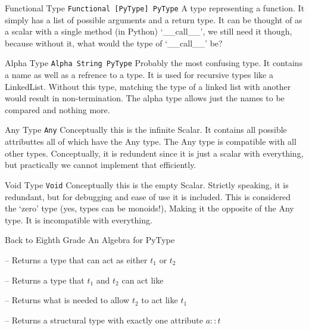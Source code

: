\documentclass[12pt,t]{beamer}
\newcommand{\subt}[1]{{\footnotesize \color{subtitle} {#1}}}
\newcommand{\codehs}{\texttt}
\newcommand{\vitem}{\vfill\item}
\begin{document}
\begin{frame}{Functional Type}
    \vfill
    \codehs{Functional [PyType] PyType}
    \vfill
    A type representing a function. It simply has a list
    of possible arguments and a return type. It can be thought
    of as a scalar with a single method (in Python) `\_\_call\_\_',
    we still need it though, because without it, what would the type
    of `\_\_call\_\_' be?
    \vfill
\end{frame}

\begin{frame}{Alpha Type}
    \vfill
    \codehs{Alpha String PyType}
    \vfill
    Probably the most confusing type. It contains a name as well
    as a refrence to a type. It is used for recursive types like
    a LinkedList. Without this type, matching the type of a linked
    list with another would result in non-termination. The alpha
    type allows just the names to be compared and nothing more.
    \vfill
\end{frame}

\begin{frame}{Any Type}
    \vfill
    \codehs{Any}
    \vfill
    Conceptually this is the infinite Scalar. It contains all
    possible attributtes all of which have the Any type. The
    Any type is compatible with all other types. Conceptually,
    it is redundent since it is just a scalar with everything,
    but practically we cannot implement that efficiently.
    \vfill
\end{frame}

\begin{frame}{Void Type}
    \vfill
    \codehs{Void}
    \vfill
    Conceptually this is the empty Scalar. Strictly speaking, it
    is redundant, but for debugging and ease of use it is included. This
    is considered the `zero' type (yes, types can be monoids!),
    Making it the opposite of the Any type. It is incompatible with everything.
    \vfill
\end{frame}

\begin{frame}{Back to Eighth Grade}
    \subt{An Algebra for PyType}

    \begin{description}
        \vitem[Union $t_1$ $t_2$] -- Returns a type that can act as either $t_1$ or $t_2$
        \vitem[Intersection $t_1$ $t_2$] -- Returns a type that $t_1$ and $t_2$ can act like
        \vitem[Difference $t_1$ $t_2$] -- Returns what is needed to allow $t_2$ to act like $t_1$
        \vitem[Singleton $a$ $t$] -- Returns a structural type with exactly one attribute $a::t$
    \end{description}
\end{frame}
\end{document}
